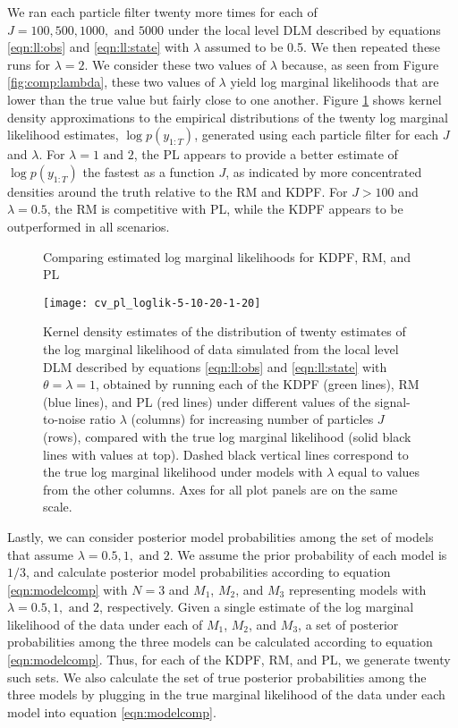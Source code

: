We ran each particle filter twenty more times for each of $J = 100, 500, 1000, \mbox{ and } 5000$ under the local level DLM described by equations \eqref{eqn:ll:obs} and \eqref{eqn:ll:state} with $\lambda$ assumed to be 0.5. We then repeated these runs for $\lambda = 2$. We consider these two values of $\lambda$ because, as seen from Figure \ref{fig:comp:lambda}, these two values of $\lambda$ yield log marginal likelihoods that are lower than the true value but fairly close to one another. Figure \ref{fig:comp:loglik} shows kernel density approximations to the empirical distributions of the twenty log marginal likelihood estimates, $\log p(y_{1:T})$, generated using each particle filter for each $J$ and $\lambda$. For $\lambda = 1 \mbox{ and } 2$, the PL appears to provide a better estimate of $\log p(y_{1:T})$ the fastest as a function $J$, as indicated by more concentrated densities around the truth relative to the RM and KDPF. For $J > 100$ and $\lambda = 0.5$, the RM is competitive with PL, while the KDPF appears to be outperformed in all scenarios.

\begin{figure}[ht]
\ssp
\centering
\caption{Comparing estimated log marginal likelihoods for KDPF, RM, and PL} \label{fig:comp:loglik}
\texttt{[image: cv\_pl\_loglik-5-10-20-1-20]}
\caption*{Kernel density estimates of the distribution of twenty estimates of the log marginal likelihood of data simulated from the local level DLM described by equations \eqref{eqn:ll:obs} and \eqref{eqn:ll:state} with $\theta = \lambda = 1$, obtained by running each of the KDPF (green lines), RM (blue lines), and PL (red lines) under different values of the signal-to-noise ratio $\lambda$ (columns) for increasing number of particles $J$ (rows), compared with the true log marginal likelihood (solid black lines with values at top). Dashed black vertical lines correspond to the true log marginal likelihood under models with $\lambda$ equal to values from the other columns. Axes for all plot panels are on the same scale.}
\end{figure}

Lastly, we can consider posterior model probabilities among the set of models that assume $\lambda = 0.5, 1, \mbox{ and } 2$. We assume the prior probability of each model is $1/3$, and calculate posterior model probabilities according to equation \eqref{eqn:modelcomp} with $N = 3$ and $M_1$, $M_2$, and $M_3$ representing models with $\lambda = 0.5, 1, \mbox{ and } 2$, respectively. Given a single estimate of the log marginal likelihood of the data under each of $M_1$, $M_2$, and $M_3$, a set of posterior probabilities among the three models can be calculated according to equation \eqref{eqn:modelcomp}. Thus, for each of the KDPF, RM, and PL, we generate twenty such sets. We also calculate the set of true posterior probabilities among the three models by plugging in the true marginal likelihood of the data under each model into equation \eqref{eqn:modelcomp}.


